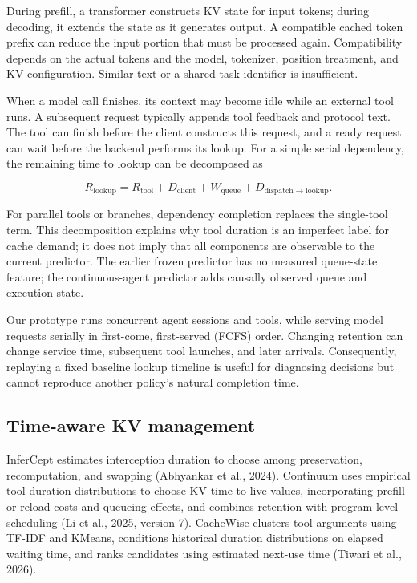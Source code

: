 \documentclass[sigconf, screen, review, balance=false]{acmart}
\begin{document}
During prefill, a transformer constructs KV state for input tokens;
during decoding, it extends the state as it generates output. A
compatible cached token prefix can reduce the input portion that must be
processed again. Compatibility depends on the actual tokens and the
model, tokenizer, position treatment, and KV configuration. Similar text
or a shared task identifier is insufficient.

When a model call finishes, its context may become idle while an
external tool runs. A subsequent request typically appends tool feedback
and protocol text. The tool can finish before the client constructs this
request, and a ready request can wait before the backend performs its
lookup. For a simple serial dependency, the remaining time to lookup can
be decomposed as

\[
R_{\mathrm{lookup}}=R_{\mathrm{tool}}+D_{\mathrm{client}}
 +W_{\mathrm{queue}}+D_{\mathrm{dispatch\to lookup}}.
\]

For parallel tools or branches, dependency completion replaces the
single-tool term. This decomposition explains why tool duration is an
imperfect label for cache demand; it does not imply that all components
are observable to the current predictor. The earlier frozen predictor has no
measured queue-state feature; the continuous-agent predictor adds
causally observed queue and execution state.

Our prototype runs concurrent agent sessions and tools, while serving
model requests serially in first-come, first-served (FCFS) order.
Changing retention can change service time, subsequent tool launches,
and later arrivals. Consequently, replaying a fixed baseline lookup
timeline is useful for diagnosing decisions but cannot reproduce another
policy's natural completion time.

\subsection{Time-aware KV
management}\label{time-aware-kv-management}

InferCept estimates interception duration to choose among preservation,
recomputation, and swapping (Abhyankar et al., 2024). Continuum uses
empirical tool-duration distributions to choose KV time-to-live values,
incorporating prefill or reload costs and queueing effects, and combines
retention with program-level scheduling (Li et al., 2025, version 7).
CacheWise clusters tool arguments using TF-IDF and KMeans, conditions
historical duration distributions on elapsed waiting time, and ranks
candidates using estimated next-use time (Tiwari et al., 2026).
\end{document}
